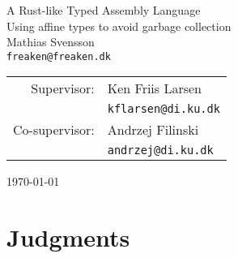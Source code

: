 




\begin{titlepage}
\begin{center}
\phantom{}
\vspace{5.0cm}
{\LARGE A Rust-like Typed Assembly Language}\\[0.5cm]
{\Large Using affine types to avoid garbage collection}\\[1.0cm]
{\large Mathias Svensson} \\
\texttt{freaken@freaken.dk} \\[0.8cm]
\begin{tabular}{rl}
Supervisor: & {\large Ken Friis Larsen} \\
            & \texttt{kflarsen@di.ku.dk} \\[0.5cm]
Co-supervisor: & {\large Andrzej Filinski} \\
               & \texttt{andrzej@di.ku.dk}
\end{tabular}

\vfill
{\large \today}
\end{center}
\end{titlepage}

\newpage
\tableofcontents
\newpage

\chapter{Judgments}





